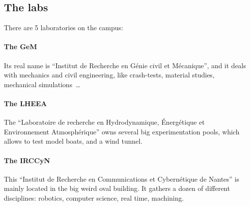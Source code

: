\subsection{The labs}
There are 5 laboratories on the campus:
\paragraph{The GeM} Its real name is “Institut de Recherche en Génie civil et Mécanique”, and it deals with mechanics and civil engineering, like crash-tests, material studies, mechanical simulations~\dots %
\paragraph{The LHEEA} The “Laboratoire de recherche en Hydrodynamique, Énergétique et Environnement Atmosphérique” owns several big experimentation pools, which allows to test model boats, and a wind tunnel. %
\paragraph{The IRCCyN} This “Institut de Recherche en Communications et Cybernétique de Nantes” is mainly located in the big weird oval building. It gathers a dozen of different disciplines: robotics, computer science, real time, machining. %
